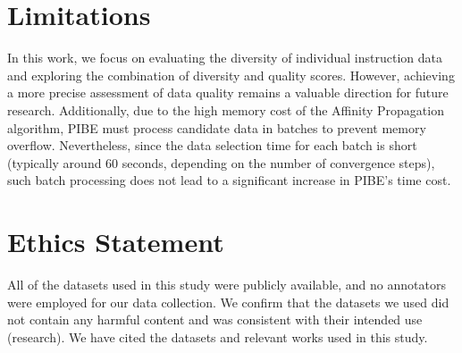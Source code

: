 \section*{Limitations}

In this work, we focus on evaluating the diversity of individual instruction data and exploring the combination of diversity and quality scores. However, achieving a more precise assessment of data quality remains a valuable direction for future research. Additionally, due to the high memory cost of the Affinity Propagation algorithm, PIBE must process candidate data in batches to prevent memory overflow. Nevertheless, since the data selection time for each batch is short (typically around 60 seconds, depending on the number of convergence steps), such batch processing does not lead to a significant increase in PIBE's time cost.


\section*{Ethics Statement}
All of the datasets used in this study were publicly available, and no annotators were employed for our data collection. We confirm that the datasets we used did not contain any harmful content and was consistent with their intended use (research). We have cited the datasets and relevant works used in this study.